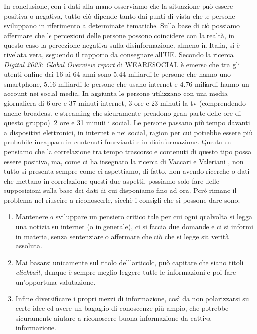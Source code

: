 \documentclass{article}
\begin{document}
\begin{justify}
    In conclusione, con i dati alla mano osserviamo che la situazione può essere positiva o negativa, tutto ciò dipende tanto dai punti di vista che le persone sviluppano in riferimento a determinate tematiche. Sulla base di ciò possiamo affermare che le percezioni delle persone possono coincidere con la realtà, in questo caso la percezione negativa sulla disinformazione, almeno in Italia, si è rivelata vera, seguendo il rapporto da consegnare all'UE.
    Secondo la ricerca \textit{Digital 2023: Global Overview report} di WEARESOCIAL è emerso che tra gli utenti online dai 16 ai 64 anni sono 5.44 miliardi le persone che hanno uno smartphone, 5.16 miliardi le persone che usano internet e 4.76 miliardi hanno un account nei social media. In aggiunta le persone utilizzano con una media giornaliera di 6 ore e 37 minuti internet, 3 ore e 23 minuti la tv (comprendendo anche broadcast e streaming che sicuramente prendono gran parte delle ore di questo gruppo), 2 ore e 31 minuti i social.\citep{WEARESOCIAL}
    Le persone passano più tempo davanti a dispositivi elettronici, in internet e nei social, ragion per cui potrebbe essere più probabile incappare in contenuti fuorvianti e in disinformazione. Questo se pensiamo che la correlazione tra tempo trascorso e contenuti di questo tipo possa essere positiva, ma, come ci ha insegnato la ricerca di Vaccari e Valeriani \citep{vaccari_outside_2021}, non tutto si presenta sempre come ci aspettiamo, di fatto, non avendo ricerche o dati che mettano in correlazione questi due aspetti, possiamo solo fare delle supposizioni sulla base dei dati di cui disponiamo fino ad ora.
    Però rimane il problema nel riuscire a riconoscerle, sicchè i consigli che si possono dare sono:
    \begin{enumerate}
    \item Mantenere o sviluppare un pensiero critico tale per cui ogni qualvolta si legga una notizia su internet (o in generale), ci si faccia due domande e ci si informi in materia, senza sentenziare o affermare che ciò che si legge sia verità assoluta.
    \item Mai basarsi unicamente sul titolo dell'articolo, può capitare che siano titoli \textit{clickbait}, dunque è sempre meglio leggere tutte le informazioni e poi fare un'opportuna valutazione.
    \item Infine diversificare i propri mezzi di informazione, così da non polarizzarsi su certe idee ed avere un bagaglio di conoscenze più ampio, che potrebbe sicuramente aiutare a riconoscere buona informazione da cattiva informazione.
    \end{enumerate}
\end{justify}
\begin{justify}
    
    
\end{justify}
    
    
\end{document}
